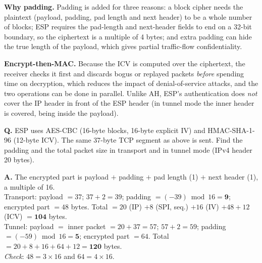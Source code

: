 \textbf{Why padding.} Padding is added for three reasons: a block cipher needs the plaintext (payload, padding, pad length and next header) to be a whole number of blocks; ESP requires the pad-length and next-header fields to end on a 32-bit boundary, so the ciphertext is a multiple of 4 bytes; and extra padding can hide the true length of the payload, which gives partial traffic-flow confidentiality.

\textbf{Encrypt-then-MAC.} Because the ICV is computed over the ciphertext, the receiver checks it first and discards bogus or replayed packets \emph{before} spending time on decryption, which reduces the impact of denial-of-service attacks, and the two operations can be done in parallel. Unlike AH, ESP's authentication does \emph{not} cover the IP header in front of the ESP header (in tunnel mode the inner header is covered, being inside the payload).

\begin{worked}
\textbf{Q.} ESP uses AES-CBC (16-byte blocks, 16-byte explicit IV) and HMAC-SHA-1-96 (12-byte ICV). The same 37-byte TCP segment as above is sent. Find the padding and the total packet size in transport and in tunnel mode (IPv4 header 20 bytes).

\textbf{A.} The encrypted part is payload $+$ padding $+$ pad length (1) $+$ next header (1), a multiple of 16.\\
Transport: payload $= 37$; $37 + 2 = 39$; padding $= (-39) \bmod 16 = \mathbf{9}$; encrypted part $= 48$ bytes. Total $= 20$ (IP) $+ 8$ (SPI, seq.) $+ 16$ (IV) $+ 48 + 12$ (ICV) $= \mathbf{104}$ bytes.\\
Tunnel: payload $=$ inner packet $= 20 + 37 = 57$; $57 + 2 = 59$; padding $= (-59) \bmod 16 = \mathbf{5}$; encrypted part $= 64$. Total $= 20 + 8 + 16 + 64 + 12 = \mathbf{120}$ bytes.\\
\emph{Check}: $48 = 3 \times 16$ and $64 = 4 \times 16$.
\end{worked}

